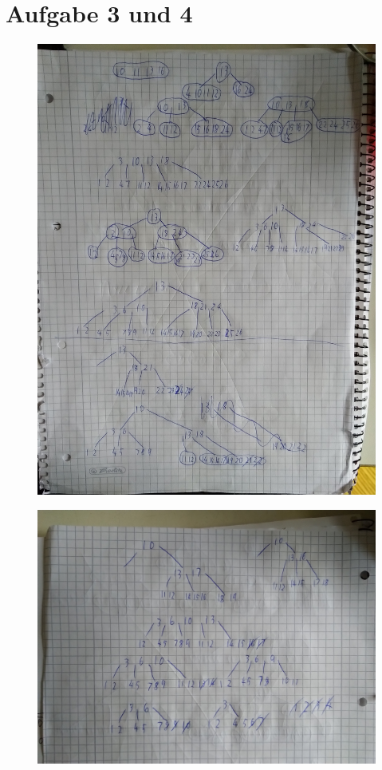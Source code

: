\documentclass[a4paper, 11pt]{article}
\begin{document}
\section*{Aufgabe 3 und 4}
\begin{figure}
    \includegraphics[height=\textwidth, angle=-90]{b_tree1}
    \centering
\end{figure}
\begin{figure}
    \includegraphics[width=\textwidth]{b_tree2}
    \centering
\end{figure}
\end{document}
